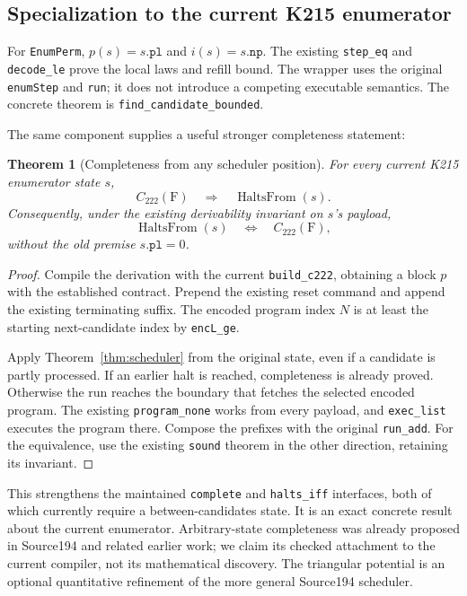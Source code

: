 \documentclass[11pt,letterpaper]{article}
\newtheorem{theorem}{Theorem}[section]
\theoremstyle{definition}
\theoremstyle{remark}
\newcommand{\code}[1]{\texttt{#1}}
\begin{document}
\subsection{Specialization to the current K215 enumerator}

For \code{EnumPerm}, $p(s)=s.\code{pl}$ and $i(s)=s.\code{np}$.
The existing \code{step\_eq} and \code{decode\_le} prove the local laws and
refill bound. The wrapper uses the original \code{enumStep} and \code{run};
it does not introduce a competing executable semantics. The concrete theorem
is \code{find\_candidate\_bounded}.

The same component supplies a useful stronger completeness statement:
\begin{theorem}[Completeness from any scheduler position]
\label{thm:complete}
For every current K215 enumerator state $s$,
\[
 C_{222}(\mathrm{F})\quad\Longrightarrow\quad
                    \operatorname{HaltsFrom}(s).
\]
Consequently, under the existing derivability invariant on $s$'s payload,
\[
 \operatorname{HaltsFrom}(s)\quad\Longleftrightarrow\quad C_{222}(\mathrm F),
\]
without the old premise $s.\code{pl}=0$.
\end{theorem}

\begin{proof}
Compile the derivation with the current \code{build\_c222}, obtaining a
block $p$ with the established contract. Prepend the existing reset command
and append the existing terminating suffix. The encoded program index $N$
is at least the starting next-candidate index by \code{encL\_ge}.

Apply Theorem~\ref{thm:scheduler} from the original state, even if a candidate
is partly processed. If an earlier halt is reached, completeness is already
proved. Otherwise the run reaches the boundary that fetches the selected
encoded program. The existing \code{program\_none} works from every payload,
and \code{exec\_list} executes the program there. Compose the prefixes with
the original \code{run\_add}. For the equivalence, use the existing
\code{sound} theorem in the other direction, retaining its invariant.
\end{proof}

This strengthens the maintained \code{complete} and \code{halts\_iff}
interfaces, both of which currently require a between-candidates state.
It is an exact concrete result about the current enumerator. Arbitrary-state
completeness was already proposed in Source194 and related earlier work;
we claim its checked attachment to the current compiler, not its mathematical
discovery. The triangular potential is an optional quantitative refinement
of the more general Source194 scheduler.
\end{document}
